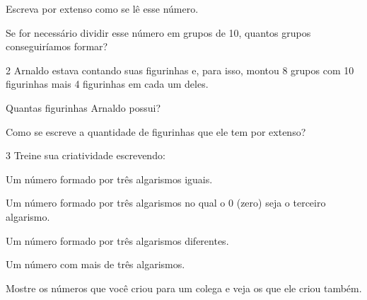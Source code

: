 
\begin{escolha}
\item
  Escreva por extenso como se lê esse número.


\item
  Se for necessário dividir esse número em grupos de 10, quantos grupos conseguiríamos formar?

\end{escolha}

\num{2} Arnaldo estava contando suas figurinhas e, para isso, montou 8 grupos com
10 figurinhas mais 4 figurinhas em cada um deles.

\begin{escolha}
\item
  Quantas figurinhas Arnaldo possui?


\item
  Como se escreve a quantidade de figurinhas que ele tem por extenso?

\end{escolha}

\num{3} Treine sua criatividade escrevendo:

\begin{escolha}
\item Um número formado por três algarismos iguais.


\item Um número formado por três algarismos no qual o 0 (zero) seja o terceiro algarismo.


\item Um número formado por três algarismos diferentes.


\item Um número com mais de três algarismos.


\item Mostre os números que você criou para um colega e veja os que ele criou também.
\end{escolha}

